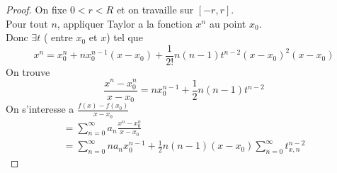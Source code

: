 \documentclass[../main.tex]{subfiles}
\begin{document}
\begin{proof}
	On fixe $0<r<R$ et on travaille sur $[-r,r]$.\\
	Pour tout $n$, appliquer Taylor a la fonction $x^{n}$ au point $x_0$.\\
	Donc $\exists t$ ( entre $x_0$ et $x$) tel que
	\[ 
		x^{n} = x_0^{n} + n x_0^{n-1} ( x-x_0) + \frac{1}{2!}n ( n-1) t ^{n-2}( x-x_0)^{2} ( x-x_0) 
	\]
On trouve
\[ 
	\frac{x^{n}-x_0^{n}}{x-x_0} = n x_0^{n-1} + \frac{1}{2}n ( n-1) t^{n-2}
\]
On s'interesse a $ \frac{f( x) - f( x_0) }{x-x_0}$
\begin{align*}
=\sum_{n=0}^{ \infty } a_n \frac{x^{n}- x_0^{n}}{x-x_0}\\
= \sum_{n=0}^{ \infty } n a_n x_0^{n-1} + \frac{1}{2}n ( n-1) ( x-x_0) \sum_{n=0}^{ \infty } t^{n-2}_{x,n} 
\end{align*}


\end{proof}
\end{document}
